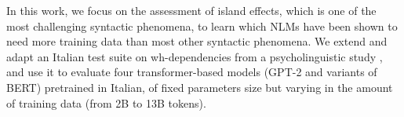 In this work, we focus on the assessment of island effects, which is one of the most challenging syntactic phenomena, to learn which NLMs have been shown to need more training data than most other syntactic phenomena. We extend and adapt an Italian test suite on wh-dependencies from a psycholinguistic study \citep{sprouse2016experimental}, and use it to evaluate four transformer-based models (GPT-2 and variants of BERT) pretrained in Italian, of fixed parameters size but varying in the amount of training data (from 2B to 13B tokens). %

